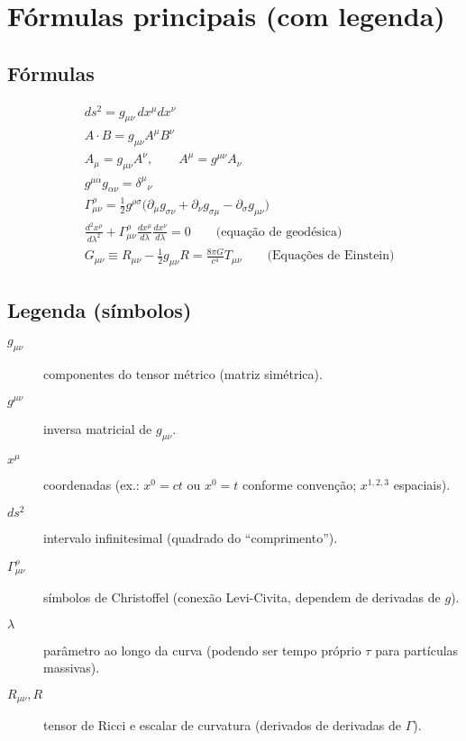 \documentclass[11pt]{article}
\begin{document}
\section{Fórmulas principais (com legenda)}
\subsection*{Fórmulas}
\begin{align}
  &ds^2 = g_{\mu\nu}\,dx^\mu dx^\nu \label{eq:intervalo}\\[4pt]
  &A\cdot B = g_{\mu\nu}A^\mu B^\nu \\[4pt]
  &A_\mu = g_{\mu\nu}A^\nu,\qquad A^\mu = g^{\mu\nu}A_\nu\\[4pt]
  &g^{\mu\alpha}g_{\alpha\nu} = \delta^\mu{}_\nu\\[6pt]
  &\Gamma^\rho_{\mu\nu} = \tfrac{1}{2}g^{\rho\sigma}\big(\partial_\mu g_{\sigma\nu}+\partial_\nu g_{\sigma\mu}-\partial_\sigma g_{\mu\nu}\big) \label{eq:christoffel}\\[6pt]
  &\frac{d^2 x^\rho}{d\lambda^2} + \Gamma^\rho_{\mu\nu}\frac{dx^\mu}{d\lambda}\frac{dx^\nu}{d\lambda}=0 \qquad\text{(equação de geodésica)}\\[6pt]
  &G_{\mu\nu} \equiv R_{\mu\nu}-\tfrac{1}{2}g_{\mu\nu}R = \frac{8\pi G}{c^4}T_{\mu\nu}\qquad\text{(Equações de Einstein)}
\end{align}

\subsection*{Legenda (símbolos)}
\begin{description}
  \item[\(g_{\mu\nu}\)] componentes do tensor métrico (matriz simétrica).
  \item[\(g^{\mu\nu}\)] inversa matricial de \(g_{\mu\nu}\).
  \item[\(x^\mu\)] coordenadas (ex.: \(x^0=ct\) ou \(x^0=t\) conforme convenção; \(x^{1,2,3}\) espaciais).
  \item[\(ds^2\)] intervalo infinitesimal (quadrado do ``comprimento'').
  \item[\(\Gamma^\rho_{\mu\nu}\)] símbolos de Christoffel (conexão Levi-Civita, dependem de derivadas de \(g\)).
  \item[\(\lambda\)] parâmetro ao longo da curva (podendo ser tempo próprio \(\tau\) para partículas massivas).
  \item[\(R_{\mu\nu}, R\)] tensor de Ricci e escalar de curvatura (derivados de derivadas de \(\Gamma\)).
\end{description}
\end{document}
